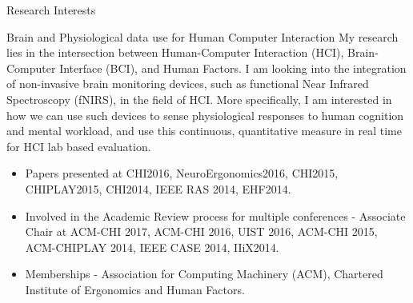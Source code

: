 \documentclass{resume} %
\begin{document}
\begin{rSection}{Research Interests}
\begin{rSubsection}{Brain and Physiological data use for Human Computer Interaction}{ }{ }{ }
\vspace{-5 mm}
My research lies in the intersection between Human-Computer Interaction (HCI), Brain-Computer
Interface (BCI), and Human Factors. I am looking into the integration of non-invasive
brain monitoring devices, such as functional Near Infrared Spectroscopy (fNIRS), in the field of HCI.
More specifically, I am interested in how we can use such devices to sense physiological responses to
human cognition and mental workload, and use this continuous, quantitative measure in real time for HCI lab based evaluation.

\begin{itemize}
  \item Papers presented at CHI2016, NeuroErgonomics2016, CHI2015, CHIPLAY2015, CHI2014, IEEE RAS 2014, EHF2014.
  \item Involved in the Academic Review process for multiple conferences - Associate Chair at ACM-CHI 2017, ACM-CHI 2016, UIST 2016, ACM-CHI 2015, ACM-CHIPLAY 2014, IEEE CASE 2014, IIiX2014.
  \item  Memberships - Association for Computing Machinery (ACM), Chartered Institute of Ergonomics and Human Factors.
\end{itemize}

\end{rSubsection}

\end{rSection}
\end{document}
